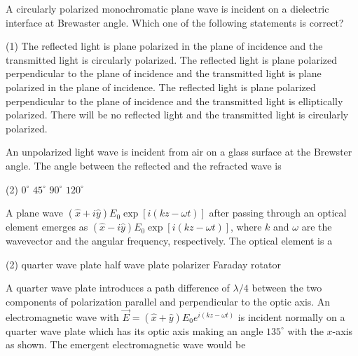\begin{enumerate}
\begin{minipage}{\textwidth}
	\item A circularly polarized monochromatic plane wave is incident on a dielectric interface at Brewaster angle. Which one of the following statements is correct?
\end{minipage}
\begin{tasks}(1)
	\task[\textbf{A.}] The reflected light is plane polarized in the plane of incidence and the transmitted light is circularly polarized.
	\task[\textbf{B.}]The reflected light is plane polarized perpendicular to the plane of incidence and the transmitted light is plane polarized in the plane of incidence.
	\task[\textbf{C.}]The reflected light is plane polarized perpendicular to the plane of incidence and the transmitted light is elliptically polarized.
	\task[\textbf{D.}]There will be no reflected light and the transmitted light is circularly polarized.
\end{tasks}
\begin{minipage}{\textwidth}
	\item An unpolarized light wave is incident from air on a glass surface at the Brewster angle. The angle between the reflected and the refracted wave is
\end{minipage}
\begin{tasks}(2)
	\task[\textbf{A.}] $0^{\circ}$
	\task[\textbf{B.}]$45^{\circ}$
	\task[\textbf{C.}]$90^{\circ}$
	\task[\textbf{D.}]$120^{\circ}$
\end{tasks}
\begin{minipage}{\textwidth}
	\item A plane wave $(\hat{x}+i \hat{y}) E_{0} \exp [i(k z-\omega t)]$ after passing through an optical element emerges as $(\hat{x}-i \hat{y}) E_{0} \exp [i(k z-\omega t)]$, where $k$ and $\omega$ are the wavevector and the angular frequency, respectively. The optical element is a
\end{minipage}
\begin{tasks}(2)
	\task[\textbf{A.}] quarter wave plate
	\task[\textbf{B.}] half wave plate
	\task[\textbf{C.}] polarizer
	\task[\textbf{D.}]Faraday rotator
\end{tasks}
\begin{minipage}{\textwidth}
	\item A quarter wave plate introduces a path difference of $\lambda / 4$ between the two components of polarization parallel and perpendicular to the optic axis. An electromagnetic wave with $\vec{E}=(\hat{x}+\hat{y}) E_{0} e^{i(k z-\omega t)}$ is incident normally on a quarter wave plate which has its optic axis making an angle $135^{\circ}$ with the $x$-axis as shown. The emergent electromagnetic wave would be

\end{minipage}
\end{enumerate}
